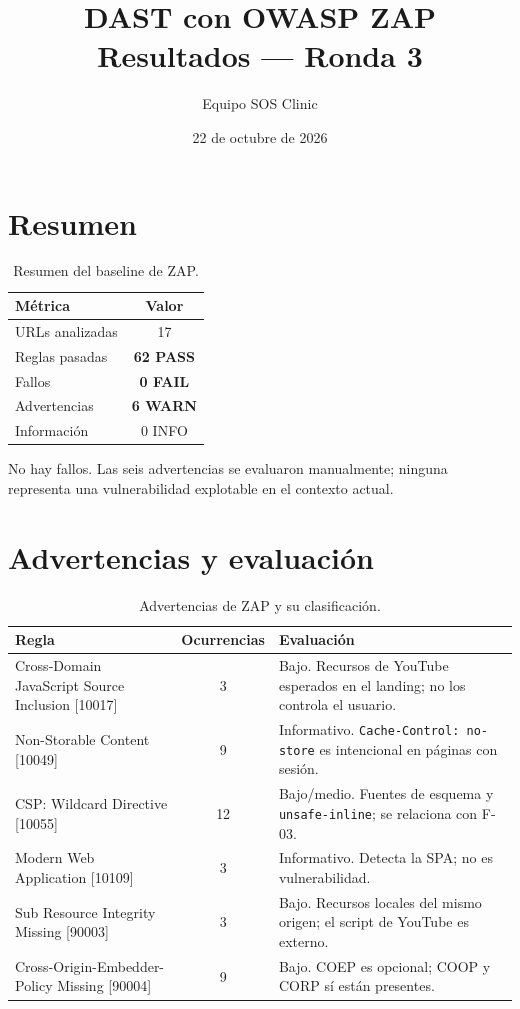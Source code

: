 \documentclass[11pt]{article}
\title{\textbf{DAST con OWASP ZAP}\\[0.3em]
\large Resultados --- Ronda 3}
\author{Equipo SOS Clinic}
\date{22 de octubre de 2026}
\begin{document}
\maketitle

\section{Resumen}

\begin{table}[h]
\centering
\small
\begin{tabular}{@{}lc@{}}
\toprule
Métrica & Valor \\
\midrule
URLs analizadas & 17 \\
Reglas pasadas & \textbf{62 PASS} \\
Fallos & \textbf{0 FAIL} \\
Advertencias & \textbf{6 WARN} \\
Información & 0 INFO \\
\bottomrule
\end{tabular}
\caption{Resumen del baseline de ZAP.}
\end{table}

No hay fallos. Las seis advertencias se evaluaron manualmente; ninguna
representa una vulnerabilidad explotable en el contexto actual.

\section{Advertencias y evaluación}

\begin{table}[h]
\centering
\small
\begin{tabular}{@{}p{4.6cm}cp{7.6cm}@{}}
\toprule
Regla & Ocurrencias & Evaluación \\
\midrule
Cross-Domain JavaScript Source Inclusion [10017] & 3 & Bajo. Recursos de YouTube esperados en el landing; no los controla el usuario. \\
Non-Storable Content [10049] & 9 & Informativo. \texttt{Cache-Control: no-store} es intencional en páginas con sesión. \\
CSP: Wildcard Directive [10055] & 12 & Bajo/medio. Fuentes de esquema y \texttt{unsafe-inline}; se relaciona con F-03. \\
Modern Web Application [10109] & 3 & Informativo. Detecta la SPA; no es vulnerabilidad. \\
Sub Resource Integrity Missing [90003] & 3 & Bajo. Recursos locales del mismo origen; el script de YouTube es externo. \\
Cross-Origin-Embedder-Policy Missing [90004] & 9 & Bajo. COEP es opcional; COOP y CORP sí están presentes. \\
\bottomrule
\end{tabular}
\caption{Advertencias de ZAP y su clasificación.}
\end{table}
\end{document}
